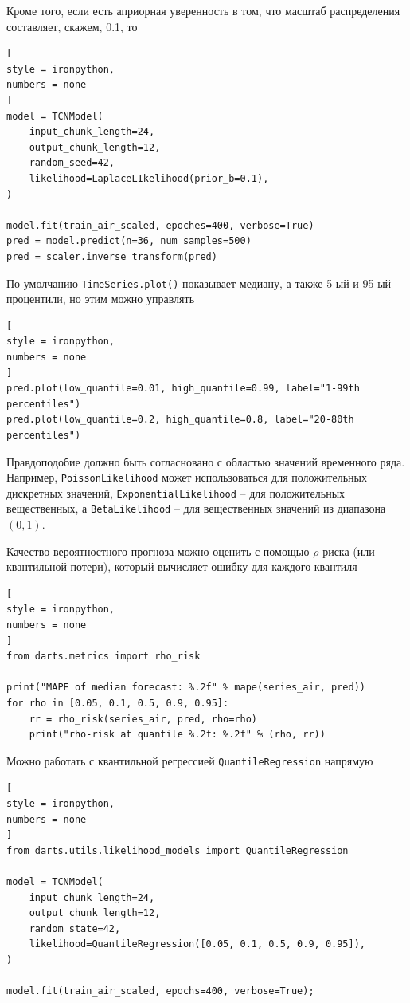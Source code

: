 \documentclass[%
	11pt,
	a4paper,
	utf8,
		]{article}
\begin{document}
Кроме того, если есть априорная уверенность в том, что масштаб распределения составляет, скажем, 0.1, то
\begin{lstlisting}[
style = ironpython,
numbers = none
]
model = TCNModel(
    input_chunk_length=24,
    output_chunk_length=12,
    random_seed=42,
    likelihood=LaplaceLIkelihood(prior_b=0.1),
)

model.fit(train_air_scaled, epoches=400, verbose=True)
pred = model.predict(n=36, num_samples=500)
pred = scaler.inverse_transform(pred)
\end{lstlisting}

По умолчанию \verb|TimeSeries.plot()| показывает медиану, а также 5-ый и 95-ый процентили, но этим можно управлять
\begin{lstlisting}[
style = ironpython,
numbers = none
]
pred.plot(low_quantile=0.01, high_quantile=0.99, label="1-99th percentiles")
pred.plot(low_quantile=0.2, high_quantile=0.8, label="20-80th percentiles")
\end{lstlisting}

Правдоподобие должно быть согласновано с областью значений временного ряда. Например, \verb|PoissonLikelihood| может использоваться для положительных дискретных значений, \verb|ExponentialLikelihood| -- для положительных вещественных, а \verb|BetaLikelihood| -- для вещественных значений из диапазона $ (0, 1) $.

Качество вероятностного прогноза можно оценить с помощью $ \rho $-риска (или квантильной потери), который вычисляет ошибку для каждого квантиля
\begin{lstlisting}[
style = ironpython,
numbers = none
]
from darts.metrics import rho_risk

print("MAPE of median forecast: %.2f" % mape(series_air, pred))
for rho in [0.05, 0.1, 0.5, 0.9, 0.95]:
	rr = rho_risk(series_air, pred, rho=rho)
	print("rho-risk at quantile %.2f: %.2f" % (rho, rr))
\end{lstlisting}

Можно работать с квантильной регрессией \verb|QuantileRegression| напрямую
\begin{lstlisting}[
style = ironpython,
numbers = none
]
from darts.utils.likelihood_models import QuantileRegression

model = TCNModel(
	input_chunk_length=24,
	output_chunk_length=12,
	random_state=42,
	likelihood=QuantileRegression([0.05, 0.1, 0.5, 0.9, 0.95]),
)

model.fit(train_air_scaled, epochs=400, verbose=True);
\end{lstlisting}
\end{document}
